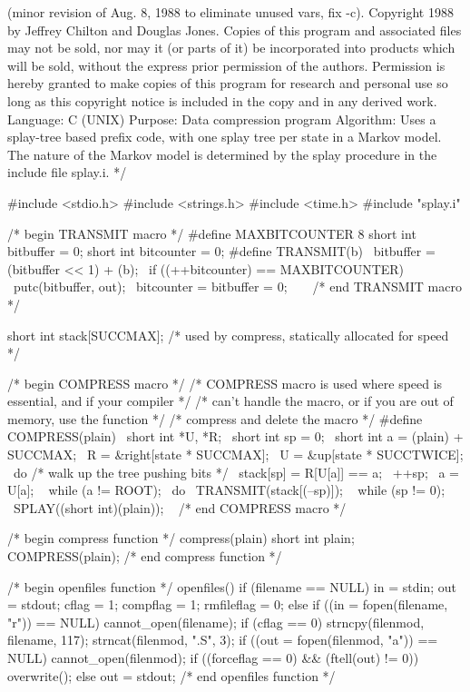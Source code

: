 	 (minor revision of Aug. 8, 1988 to eliminate unused vars, fix -c).
   Copyright 1988 by Jeffrey Chilton and Douglas Jones.
	      Copies of this program and associated files may not be sold,
			nor may it (or parts of it) be incorporated into
			products which will be sold, without the express
			prior permission of the authors.
	      Permission is hereby granted to make copies of this program for
			research and personal use so long as this copyright
			notice is included in the copy and in any derived work.
   Language: C (UNIX)
   Purpose: Data compression program
   Algorithm: Uses a splay-tree based prefix code, with one splay tree per
			state in a Markov model.  The nature of the Markov
			model is determined by the splay procedure in the
			include file splay.i.
*/

#include <stdio.h>
#include <strings.h>
#include <time.h>
#include "splay.i"

/* begin TRANSMIT macro */
#define MAXBITCOUNTER 8
short int bitbuffer = 0;
short int bitcounter = 0;
#define TRANSMIT(b) {						\
	bitbuffer = (bitbuffer << 1) + (b);			\
	if ((++bitcounter) == MAXBITCOUNTER) {			\
		putc(bitbuffer, out);				\
		bitcounter = bitbuffer = 0;			\
	}							\
}
/* end TRANSMIT macro */

short int stack[SUCCMAX]; /* used by compress, statically allocated for speed */

/* begin COMPRESS macro */
/* COMPRESS macro is used where speed is essential, and if your compiler */
/* can't handle the macro, or if you are out of memory, use the function */
/* compress and delete the macro */
#define COMPRESS(plain) {					\
	short int *U, *R;					\
	short int sp = 0;					\
	short int a = (plain) + SUCCMAX;			\
	R = &right[state * SUCCMAX];				\
	U = &up[state * SUCCTWICE];				\
	do { 		/* walk up the tree pushing bits */	\
		stack[sp] = R[U[a]] == a;			\
		++sp;						\
		a = U[a];					\
 	} while (a != ROOT);					\
	do {							\
		TRANSMIT(stack[(--sp)]);			\
	} while (sp != 0);					\
	SPLAY((short int)(plain));				\
}
/* end COMPRESS macro */

/* begin compress function */
compress(plain)
short int plain;
{
	COMPRESS(plain);
}
/* end compress function */

/* begin openfiles function */
openfiles()
{
	if (filename == NULL) {
		in = stdin;
		out = stdout;
		cflag = 1;
		compflag = 1;
		rmfileflag = 0;
	} else {
		if ((in = fopen(filename, "r")) == NULL) cannot_open(filename);
		if (cflag == 0) {
			strncpy(filenmod, filename, 117);
			strncat(filenmod, ".S", 3);
			if ((out = fopen(filenmod, "a")) == NULL) {
				cannot_open(filenmod);
			}
			if ((forceflag == 0) && (ftell(out) != 0)) overwrite();
		} else out = stdout;
	}
}
/* end openfiles function */

